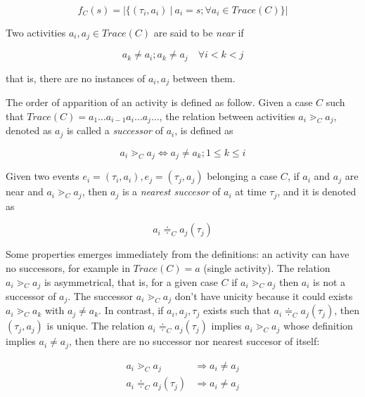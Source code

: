 \documentclass{article}
\begin{document}
\begin{equation*}
    f_C(s)=|\{ (\tau_i, a_i)\ |\ a_i = s; \forall a_i \in Trace(C)  \}| 
\end{equation*}

Two activities $a_i, a_j \in Trace(C)$ are said to be \emph{near} if 

$$a_k \neq a_i; a_k \neq a_j \quad \forall i < k < j$$

that is, there are no instances of $a_i, a_j$ between them.

The order of apparition of an activity is defined as follow. Given a case $C$ such that $Trace(C) = a_1 \dots a_{i-1} a_i \dots a_j \dots$, the relation between activities $a_i \gtrdot_C a_j$, denoted as $a_j$ is called a \emph{successor} of $a_i$, is defined as

\begin{equation}
    a_i \gtrdot_C a_j \iff a_j \neq a_k; 1 \leq k \leq i 
\end{equation}

Given two events $e_i=(\tau_i, a_i), e_j=(\tau_j, a_j)$ belonging a case $C$, if $a_i$ and $a_j$ are near and $a_i \gtrdot_C a_j$, then $a_j$ is a \emph{nearest succesor} of $a_i$ at time $\tau_j$, and it is denoted as

\begin{equation}
    a_i \doteqdot_C a_j(\tau_j)
\end{equation}

Some properties emerges immediately from the definitions: an activity can have no successors, for example in $Trace(C)=a$ (single activity). The relation $a_i \gtrdot_C a_j$ is asymmetrical, that is, for a given case $C$ if $a_i \gtrdot_C a_j$ then $a_i$ is not a successor of $a_j$. The successor $a_i \gtrdot_C a_j$ don't have unicity because it could exists $a_i \gtrdot_C a_k$ with $a_j \neq a_k$. In contrast, if $a_i, a_j, \tau_j$ exists such that $a_i \doteqdot_C a_j(\tau_j)$, then $(\tau_j, a_j)$ is unique. The relation $a_i \doteqdot_C a_j(\tau_j)$ implies $a_i \gtrdot_C a_j$ whose definition implies $a_i \neq a_j$, then there are no successor nor nearest succesor of itself:

\begin{equation}
\begin{split}
              a_i \gtrdot_C a_j & \Rightarrow a_i \neq a_j \\
    a_i \doteqdot_C a_j(\tau_j) & \Rightarrow a_i \neq a_j
\end{split}
\end{equation}
\end{document}
